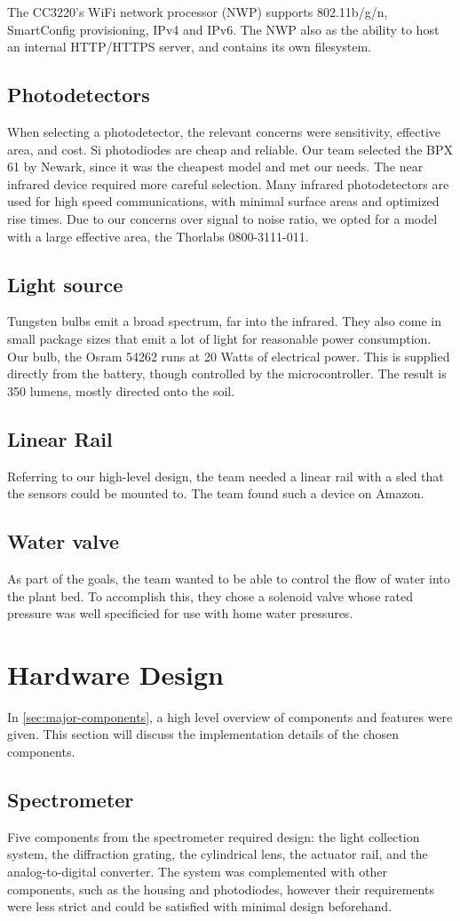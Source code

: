 \documentclass[journal]{IEEEtran}
\begin{document}
The CC3220's WiFi network processor (NWP) supports 802.11b/g/n, SmartConfig provisioning, IPv4 and IPv6. The NWP also as the ability to host an internal HTTP/HTTPS server, and contains its own filesystem.
\subsection{Photodetectors}
When selecting a photodetector, the relevant concerns were sensitivity, effective area, and cost. Si photodiodes are cheap and reliable. Our team selected the BPX 61 by Newark, since it was the cheapest model and met our needs. The near infrared device required more careful selection. Many infrared photodetectors are used for high speed communications, with minimal surface areas and optimized rise times. Due to our concerns over signal to noise ratio, we opted for a model with a large effective area, the Thorlabs 0800-3111-011.
\subsection{Light source}
Tungsten bulbs emit a broad spectrum, far into the infrared. They also come in small package sizes that emit a lot of light for reasonable power consumption. Our bulb, the Osram 54262 runs at 20 Watts of electrical power. This is supplied directly from the battery, though controlled by the microcontroller. The result is 350 lumens, mostly directed onto the soil.
\subsection{Linear Rail}
Referring to our high-level design, the team needed a linear rail with a sled that the sensors could be mounted to. The team found such a device on Amazon.
\subsection{Water valve}
As part of the goals, the team wanted to be able to control the flow of water into the plant bed. To accomplish this, they chose a solenoid valve whose rated pressure was well specificied for use with home water pressures.
\section{Hardware Design}
In \autoref{sec:major-components}, a high level overview of components and features were given. This section will discuss the implementation details of the chosen components.
\subsection{Spectrometer}
Five components from the spectrometer required design: the light collection system, the diffraction grating, the cylindrical lens, the actuator rail, and the analog-to-digital converter. The system was complemented with other components, such as the housing and photodiodes, however their requirements were less strict and could be satisfied with minimal design beforehand. 
\end{document}
